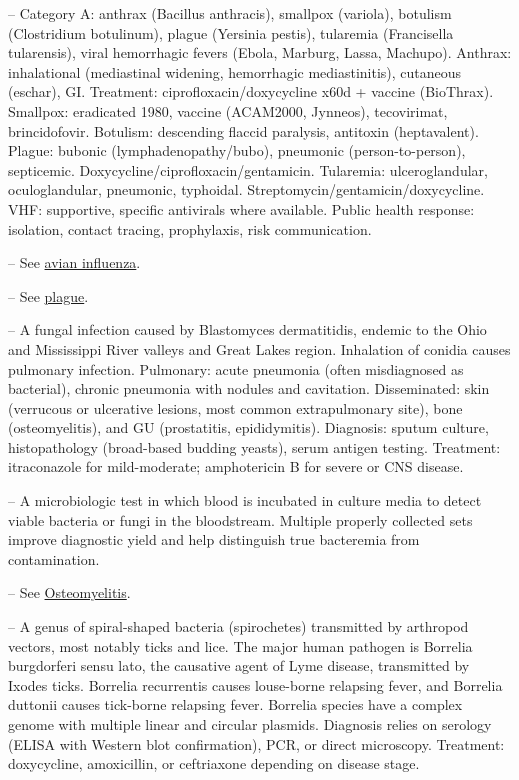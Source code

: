 -- Category A: anthrax (Bacillus anthracis), smallpox (variola), botulism (Clostridium botulinum), plague (Yersinia pestis), tularemia (Francisella tularensis), viral hemorrhagic fevers (Ebola, Marburg, Lassa, Machupo). Anthrax: inhalational (mediastinal widening, hemorrhagic mediastinitis), cutaneous (eschar), GI. Treatment: ciprofloxacin/doxycycline x60d + vaccine (BioThrax). Smallpox: eradicated 1980, vaccine (ACAM2000, Jynneos), tecovirimat, brincidofovir. Botulism: descending flaccid paralysis, antitoxin (heptavalent). Plague: bubonic (lymphadenopathy/bubo), pneumonic (person-to-person), septicemic. Doxycycline/ciprofloxacin/gentamicin. Tularemia: ulceroglandular, oculoglandular, pneumonic, typhoidal. Streptomycin/gentamicin/doxycycline. VHF: supportive, specific antivirals where available. Public health response: isolation, contact tracing, prophylaxis, risk communication.

-- See \hyperlink{Avian Influenza}{avian influenza}.

-- See \hyperlink{Plague}{plague}.

-- A fungal infection caused by Blastomyces dermatitidis, endemic to the Ohio and Mississippi River valleys and Great Lakes region. Inhalation of conidia causes pulmonary infection. Pulmonary: acute pneumonia (often misdiagnosed as bacterial), chronic pneumonia with nodules and cavitation. Disseminated: skin (verrucous or ulcerative lesions, most common extrapulmonary site), bone (osteomyelitis), and GU (prostatitis, epididymitis). Diagnosis: sputum culture, histopathology (broad-based budding yeasts), serum antigen testing. Treatment: itraconazole for mild-moderate; amphotericin B for severe or CNS disease.

-- A microbiologic test in which blood is incubated in culture media to detect viable bacteria or fungi in the bloodstream. Multiple properly collected sets improve diagnostic yield and help distinguish true bacteremia from contamination.

-- See \hyperlink{Osteomyelitis}{Osteomyelitis}.

-- A genus of spiral-shaped bacteria (spirochetes) transmitted by arthropod vectors, most notably ticks and lice. The major human pathogen is Borrelia burgdorferi sensu lato, the causative agent of Lyme disease, transmitted by Ixodes ticks. Borrelia recurrentis causes louse-borne relapsing fever, and Borrelia duttonii causes tick-borne relapsing fever. Borrelia species have a complex genome with multiple linear and circular plasmids. Diagnosis relies on serology (ELISA with Western blot confirmation), PCR, or direct microscopy. Treatment: doxycycline, amoxicillin, or ceftriaxone depending on disease stage.


